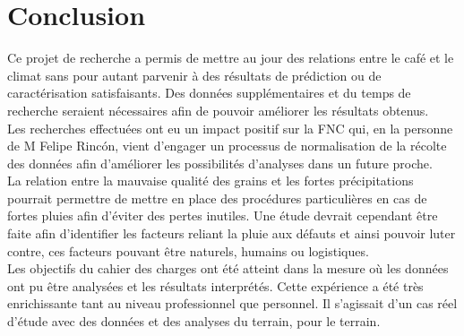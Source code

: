 

\chapter{Conclusion}










Ce projet de recherche a permis de mettre au jour des relations entre le café et le climat sans pour autant parvenir à des résultats de prédiction ou de caractérisation satisfaisants. Des données supplémentaires et du temps de recherche seraient nécessaires afin de pouvoir améliorer les résultats obtenus. \\

\noindent Les recherches effectuées ont eu un impact positif sur la FNC qui, en la personne de M Felipe Rincón, vient d'engager un processus de normalisation de la récolte des données afin d'améliorer les possibilités d'analyses dans un future proche. \\

\noindent La relation entre la mauvaise qualité des grains et les fortes précipitations pourrait permettre de mettre en place des procédures particulières en cas de fortes pluies afin d'éviter des pertes inutiles. Une étude devrait cependant être faite afin d'identifier les facteurs reliant la pluie aux défauts et ainsi pouvoir luter contre, ces facteurs pouvant être naturels, humains ou logistiques. \\

\noindent Les objectifs du cahier des charges ont été atteint dans la mesure où les données ont pu être analysées et les résultats interprétés. Cette expérience a été très enrichissante tant au niveau professionnel que personnel. Il s'agissait d'un cas réel d'étude avec des données et des analyses du terrain, pour le terrain. 



